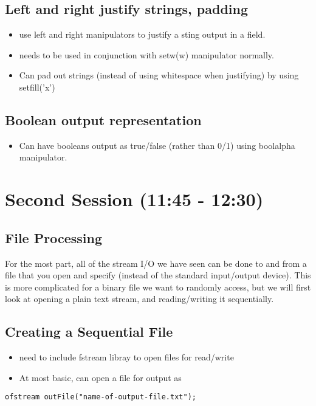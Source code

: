 \documentclass[11pt]{article}
\begin{document}
\subsection{Left and right justify strings, padding}
\label{sec-1-8}
\begin{itemize}
\item use left and right manipulators to justify a sting output in a field.
\item needs to be used in conjunction with setw(w) manipulator normally.
\item Can pad out strings (instead of using whitespace when justifying)
by using setfill('x')
\end{itemize}
\subsection{Boolean output representation}
\label{sec-1-9}
\begin{itemize}
\item Can have booleans output as true/false (rather than 0/1) using boolalpha
manipulator.
\end{itemize}


\section{Second Session (11:45 - 12:30)}
\label{sec-2}

\subsection{File Processing}
\label{sec-2-1}
For the most part, all of the stream I/O we have seen can be done to
and from a file that you open and specify (instead of the standard
input/output device).  This is more complicated for a binary file we
want to randomly access, but we will first look at opening a plain
text stream, and reading/writing it sequentially.
\subsection{Creating a Sequential File}
\label{sec-2-2}

\begin{itemize}
\item need to include fstream libray to open files for read/write
\item At most basic, can open a file for output as
\end{itemize}

\begin{verbatim}
ofstream outFile("name-of-output-file.txt");
\end{verbatim}
\end{document}
